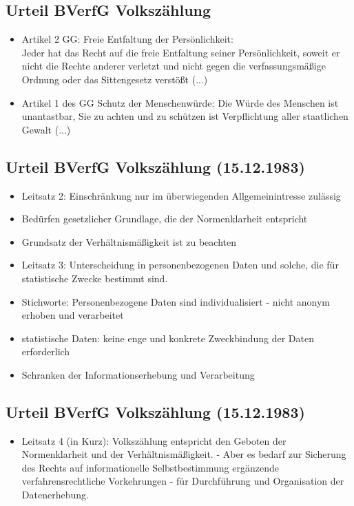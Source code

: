 \documentclass[a4paper,10pt]{scrartcl}
\begin{document}
\subsection{Urteil BVerfG Volkszählung}
\begin{itemize}
 \item Artikel 2 GG: Freie Entfaltung der Persönlichkeit:\\
 Jeder hat das Recht auf die freie Entfaltung seiner Persönlichkeit,
 soweit er nicht die Rechte anderer verletzt und nicht gegen die
 verfassungsmäßige Ordnung oder das Sittengesetz verstößt (...)
 \item Artikel 1 des GG Schutz der Menschenwürde: Die Würde des Menschen 
 ist unantastbar, Sie zu achten und zu schützen ist Verpflichtung aller
 staatlichen Gewalt (...)
\end{itemize}
\subsection{Urteil BVerfG Volkszählung (15.12.1983)}
\begin{itemize}
 \item Leitsatz 2: Einschränkung nur im überwiegenden Allgemeinintresse
 zulässig
 \item Bedürfen gesetzlicher Grundlage, die der Normenklarheit entspricht
 \item Grundsatz der Verhältnismäßigkeit ist zu beachten
 \item Leitsatz 3: Unterscheidung in personenbezogenen Daten und solche,
 die für statistische Zwecke bestimmt sind.
 \item Stichworte: Personenbezogene Daten sind individualisiert - nicht anonym erhoben und verarbeitet
 \item statistische Daten: keine enge und konkrete Zweckbindung der Daten erforderlich
 \item Schranken der Informationserhebung und Verarbeitung
\end{itemize}

\subsection{Urteil BVerfG Volkszählung (15.12.1983)}

\begin{itemize}
 \item Leitsatz 4 (in Kurz): Volkszählung entspricht den Geboten der Normenklarheit und
 der Verhältnismäßigkeit. - Aber es bedarf zur Sicherung des Rechts auf informationelle
 Selbstbestimmung ergänzende verfahrensrechtliche Vorkehrungen - für Durchführung und 
 Organisation der Datenerhebung.
\end{itemize}
\end{document}
